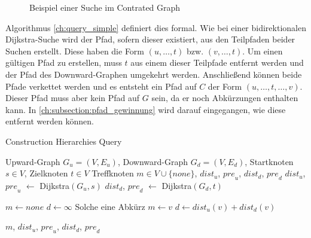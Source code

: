 \begin{figure}[ht]
  \centering
  \caption{Beispiel einer Suche im Contrated Graph}
  \label{fig:ch:beispiel_suche}
\end{figure}

Algorithmus \ref{ch:query_simple} definiert dies formal.
Wie bei einer bidirektionalen Dijkstra-Suche wird der Pfad, sofern dieser existiert, aus den Teilpfaden beider Suchen erstellt.
Diese haben die Form $(u, \dotsc, t)$ bzw. $(v, \dotsc, t)$.
Um einen gültigen Pfad zu erstellen, muss $t$ aus einem dieser Teilpfade entfernt werden und der Pfad des Downward-Graphen umgekehrt werden.
Anschließend können beide Pfade verkettet werden und es entsteht ein Pfad auf $C$ der Form $(u, \dotsc, t, \dotsc, v)$.
Dieser Pfad muss aber kein Pfad auf $G$ sein, da er noch Abkürzungen enthalten kann.
In \autoref{ch:subsection:pfad_gewinnung} wird darauf eingegangen, wie diese entfernt werden können.

\begin{algorithm}[ht]
  \caption{Construction Hierarchies Query}
  \begin{algorithmic}[1]
    \Require Upward-Graph $G_u = (V, E_u)$, Downward-Graph $G_d = (V, E_d)$, Startknoten $s \in V$, Zielknoten $t \in V$
    \Ensure Treffknoten $m \in V \cup \{ {none} \}$, ${dist}_u$, ${pre}_u$, ${dist}_d$, ${pre}_d$
    \State ${dist}_u$, ${pre}_u$ $\leftarrow$ Dijkstra$(G_u, s)$
    \State ${dist}_d$, ${pre}_d$ $\leftarrow$ Dijkstra$(G_d, t)$

    \State
    \State $m \leftarrow {none}$
    \State $d \leftarrow \infty$
    \State
    Solche eine Abkürz
    \State $m \leftarrow v$
    \State $d \leftarrow {dist}_u(v) + {dist}_d(v)$
    \EndIf
    \EndFor

    \State
    \State \Return $m$, ${dist}_u$, ${pre}_u$, ${dist}_d$, ${pre}_d$
  \end{algorithmic}
  \label{ch:query_simple}
\end{algorithm}

